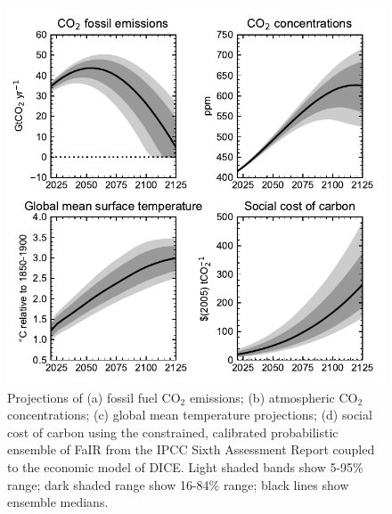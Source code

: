 \documentclass{article}
\begin{document}

\begin{figure}[!t]
\centering
\includegraphics[width=12cm]{../../figures/climate_projections.pdf}
\caption{Projections of (a) fossil fuel CO$_2$ emissions; (b) atmospheric CO$_2$ concentrations; (c) global mean temperature projections; (d) social cost of carbon using the constrained, calibrated probabilistic ensemble of FaIR from the IPCC Sixth Assessment Report coupled to the economic model of DICE. Light shaded bands show 5-95\% range; dark shaded range show 16-84\% range; black lines show ensemble medians.}
\label{fig:projections}
\end{figure}
\end{document}
